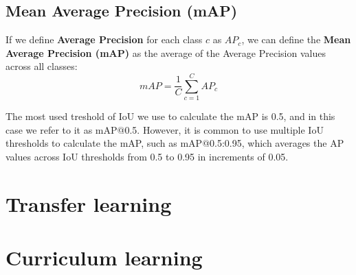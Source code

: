 \subsection*{Mean Average Precision (mAP)}
If we define \textbf{Average Precision} for each class \( c \) as \( AP_c \), we can define the \textbf{Mean Average Precision (mAP)} as the average of the Average Precision values across all classes:
\begin{equation}
    mAP = \frac{1}{C} \sum_{c=1}^{C} AP_c
\end{equation}

The most used treshold of IoU we use to calculate the mAP is 0.5, and in this case we refer to it as mAP@0.5. However, it is common to use multiple IoU thresholds to calculate the mAP, such as mAP@0.5:0.95, which averages the AP values across IoU thresholds from 0.5 to 0.95 in increments of 0.05.

\section{Transfer learning}

\section{Curriculum learning}